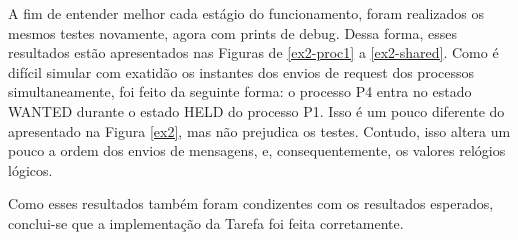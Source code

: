 \documentclass[conference]{IEEEtran}
\begin{document}
	A fim de entender melhor cada estágio do funcionamento, foram realizados os mesmos testes novamente, agora com prints de debug. Dessa forma, esses resultados estão apresentados nas Figuras de \ref{ex2-proc1} a \ref{ex2-shared}. Como é difícil simular com exatidão os instantes dos envios de request dos processos simultaneamente, foi feito da seguinte forma: o processo P4 entra no estado WANTED durante o estado HELD do processo P1. Isso é um pouco diferente do apresentado na Figura \ref{ex2}, mas não prejudica os testes. Contudo, isso altera um pouco a ordem dos envios de mensagens, e, consequentemente, os valores relógios lógicos.


	
	Como esses resultados também foram condizentes com os resultados esperados, conclui-se que a implementação da Tarefa foi feita corretamente.
	



\end{document}
